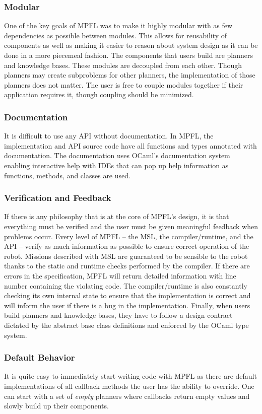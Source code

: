 \subsubsection{Modular}
One of the key goals of MPFL was to make it highly modular with as few dependencies as possible between modules. This allows for reusability of components as well as making it easier to reason about system design as it can be done in a more piecemeal fashion. The components that users build are planners and knowledge bases. These modules are decoupled from each other. Though planners may create subproblems for other planners, the implementation of those planners does not matter. The user is free to couple modules together if their application requires it, though coupling should be minimized. 

\subsubsection{Documentation}
It is difficult to use any API without documentation. In MPFL, the implementation and API source code have all functions and types annotated with documentation. The documentation uses OCaml's documentation system enabling interactive help with IDEs that can pop up help information as functions, methods, and classes are used.

\subsubsection{Verification and Feedback}
If there is any philosophy that is at the core of MPFL's design, it is that everything must be verified and the user must be given meaningful feedback when problems occur. Every level of MPFL -- the MSL, the compiler/runtime, and the API -- verify as much information as possible to ensure correct operation of the robot. Missions described with MSL are guaranteed to be sensible to the robot thanks to the static and runtime checks performed by the compiler. If there are errors in the specification, MPFL will return detailed information with line number containing the violating code. The compiler/runtime is also constantly checking its own internal state to ensure that the implementation is correct and will inform the user if there is a bug in the implementation. Finally, when users build planners and knowledge bases, they have to follow a design contract dictated by the abstract base class definitions and enforced by the OCaml type system. 

\subsubsection{Default Behavior}
It is quite easy to immediately start writing code with MPFL as there are default implementations of all callback methods the user has the ability to override. One can start with a set of \textit{empty} planners where callbacks return empty values and slowly build up their components.

